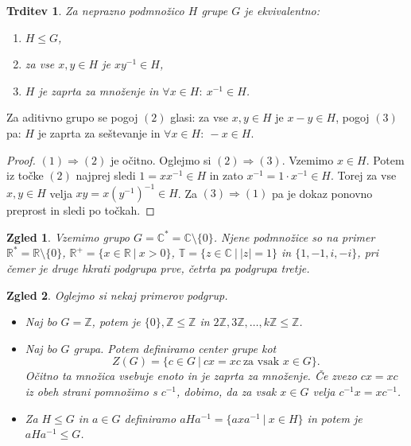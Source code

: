 \documentclass[10pt, a4paper]{article}
\newtheorem{trditev}[izr]{Trditev}
\newtheorem{zgled}{Zgled}[section]
\newenvironment{noticeC}{%
  \tcolorbox[%
  notitle,
  empty,
  enhanced,  %
  breakable,
  coltext=black, 
  fontupper=\rmfamily,
  parbox=false,
  noparskip,
  sharp corners,
  boxrule=-1pt,  %
  frame hidden,
  left=7pt,  %
  right=7pt,
  top=5pt,
  bottom=5pt,
  before skip=2.5ex plus 2pt,
  after skip=2.5ex plus 2pt,
  overlay unbroken and last={%
  },
  ]}
{\endtcolorbox}
\newenvironment{dokaz}%
  {\begin{noticeC}\begin{proof}}%
  {\end{proof}\end{noticeC}}
\newcommand{\Z}{\mathbb {Z}}
\newcommand{\R}{\mathbb {R}}
\newcommand{\C}{\mathbb {C}}
\begin{document}
\begin{trditev}
  Za neprazno podmnožico $H$ grupe $G$ je ekvivalentno:
  \begin{enumerate}
    \item $H \leq G$,
    \item za vse $x, y \in H$ je $x y^{-1} \in H$,
    \item $H$ je zaprta za množenje in $\forall x \in H:\ x^{-1} \in H$.
  \end{enumerate}
\end{trditev}

Za aditivno grupo se pogoj $(2)$ glasi: za vse $x, y \in H$ je $x - y \in H$, 
pogoj $(3)$ pa: $H$ je zaprta za seštevanje in $\forall x \in H:\ -x \in H$.

\begin{dokaz}
  $(1) \Rightarrow (2)$ je očitno. Oglejmo si $(2) \Rightarrow (3)$. Vzemimo $x \in H$.
  Potem iz točke $(2)$ najprej sledi $1 = x x^{-1} \in H$ in zato $x^{-1} = 1 \cdot x^{-1} \in H$.
  Torej za vse $x, y \in H$ velja $xy = x (y^{-1})^{-1} \in H$.
  Za $(3) \Rightarrow (1)$ pa je dokaz ponovno preprost in sledi po točkah.
\end{dokaz}

\begin{zgled}
  Vzemimo grupo $G = \C^* = \C \setminus \{0\}$. Njene podmnožice so na primer 
  $\R^* = \R \setminus \{0\}$, $\R^+ = \{x \in \R\ |\ x > 0\}$, $\mathbb{T} = \{z \in \C\ |\ |z| = 1\}$ in $\{1, -1, i, -i\}$,
  pri čemer je druge hkrati podgrupa prve, četrta pa podgrupa tretje.
\end{zgled}

\begin{zgled}
  Oglejmo si nekaj primerov podgrup.
  \begin{itemize}
    \item Naj bo $G = \Z$, potem je $\{0\}, \Z \leq \Z$ in $2 \Z, 3\Z, \dots, k \Z \leq \Z$.
    \item Naj bo $G$ grupa. Potem definiramo center grupe kot $$Z(G) = \{c \in G\ |\ cx = xc\ \text{za vsak $x \in G$}\}.$$
    Očitno ta množica vsebuje enoto in je zaprta za množenje. Če zvezo $cx = xc$ iz obeh strani pomnožimo s $c^{-1}$, dobimo,
    da za vsak $x \in G$ velja $c^{-1}x = xc^{-1}$.
    \item Za $H \leq G$ in $a \in G$ definiramo $aHa^{-1} = \{a x a^{-1}\ |\ x \in H\}$ in potem je $a H a^{-1} \leq G$.
  \end{itemize}
\end{zgled}
\end{document}
